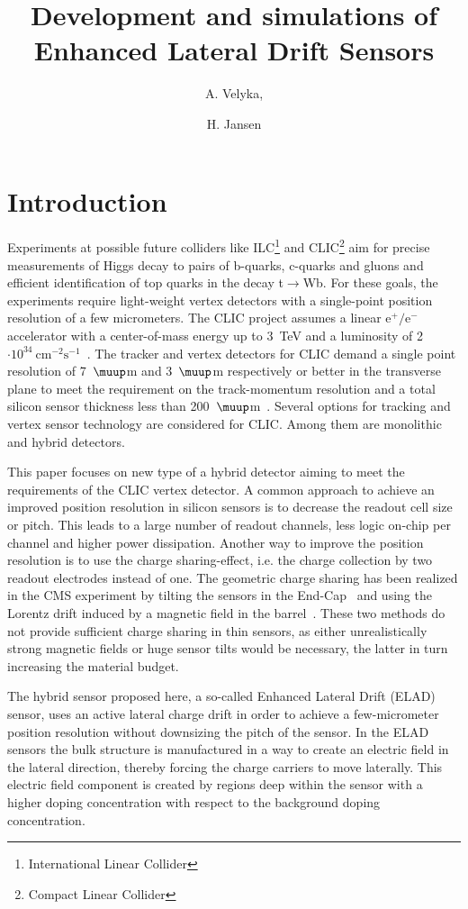 \documentclass[a4paper,11pt]{article}
\title{Development and simulations of Enhanced Lateral Drift Sensors}
\author[a,1]{A. Velyka,\note{Corresponding author.}}
\author[a]{H. Jansen}
\affiliation[a]{Deutsches Elektronen-Synchrotron DESY,\\Notkestra\ss e 85, 22607 Hamburg, Germany}
\begin{document}
\maketitle
\flushbottom

\section{Introduction}
\label{sec:intro}
Experiments at possible future colliders like ILC\footnote{International Linear Collider} and CLIC\footnote{Compact Linear Collider} aim for precise measurements of Higgs decay to pairs of b-quarks, c-quarks and gluons and efficient identification of top quarks in the decay t$\mathrm{\rightarrow}$Wb.
For these goals, the experiments require light-weight vertex detectors with a single-point position resolution of a few micrometers. 
The CLIC project assumes a linear $\mathrm{e^+/e^-}$ accelerator with a center-of-mass energy up to 3~TeV and a luminosity of 2$\mathrm{\cdot10^{34}~cm^{-2}s^{-1}}$~\cite{cdr}.
The tracker and vertex detectors for CLIC demand a single point resolution of 7~$\muup$m and 3~$\muup$m respectively or better in the transverse plane to meet the requirement on the track-momentum resolution and a total silicon sensor thickness less than 200~$\muup$m~\cite{det}.
Several options for tracking and vertex sensor technology are considered for CLIC.
Among them are monolithic and hybrid detectors.

This paper focuses on new type of a hybrid detector aiming to meet the requirements of the CLIC vertex detector.
A common approach to achieve an improved position resolution in silicon sensors is to decrease the readout cell size or pitch.
This leads to a large number of readout channels, less logic on-chip per channel and higher power dissipation. 
Another way to improve the position resolution is to use the charge sharing-effect, i.e. the charge collection by two readout electrodes instead of one.
The geometric charge sharing has been realized in the CMS experiment by tilting the sensors in the End-Cap~\cite{simon} and using the Lorentz drift induced by a magnetic field in the barrel~\cite{tdr}.
These two methods do not provide sufficient charge sharing in thin sensors, as either unrealistically strong magnetic fields or huge sensor tilts would be necessary, the latter in turn increasing the material budget.

The hybrid sensor proposed here, a so-called Enhanced Lateral Drift (ELAD) sensor, uses an active lateral charge drift in order to achieve a few-micrometer position resolution without downsizing the pitch of the sensor.
In the ELAD sensors the bulk structure is manufactured in a way to create an electric field in the lateral direction, thereby forcing the charge carriers to move laterally. 
This electric field component is created by regions deep within the sensor with a higher doping concentration with respect to the background doping concentration.
\end{document}
